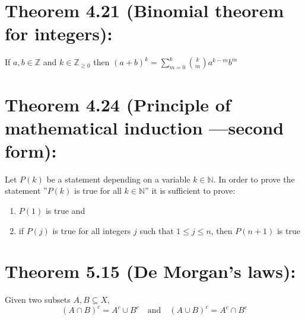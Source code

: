 \section*{Theorem 4.21 (Binomial theorem for integers):}
If $a,b \in \mathbb{Z}$ and $k \in \mathbb{Z}_{\geq 0}$ then
$(a+b)^k = \displaystyle\sum_{m=0}^{k} \binom{k}{m} a^{k-m} b^m$

\section*{Theorem 4.24 (Principle of mathematical induction —second form):}
Let $P(k)$ be a statement depending on a variable $k \in \mathbb{N}$. In order to prove the statement ”$P(k)$ is true for all $k \in \mathbb{N}$” it is sufficient to prove:
\begin{enumerate}
    \item $P(1)$ is true and
    \item if $P(j)$ is true for all integers $j$ such that $1 \leq j \leq n$, then $P(n+1)$ is true
\end{enumerate}

\section*{Theorem 5.15 (De Morgan’s laws):}
Given two subsets $A,B \subseteq X$,
\[ (A \cap B)^c = A^c \cup B^c \quad \text{and} \quad (A \cup B)^c = A^c \cap B^c \]
